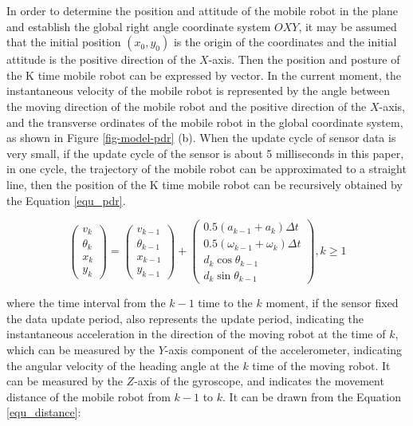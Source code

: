 \documentclass{llncs}
\begin{document}
In order to determine the position and attitude of the mobile robot in the plane and establish the global right angle coordinate system $OXY$, it may be assumed that the initial position $(x_0, y_0)$ is the origin of the coordinates and the initial attitude is the positive direction of the $X$-axis. Then the position and posture of the K time mobile robot can be expressed by vector. In the current moment, the instantaneous velocity of the mobile robot is represented by the angle between the moving direction of the mobile robot and the positive direction of the $X$-axis, and the transverse ordinates of the mobile robot in the global coordinate system, as shown in Figure \ref{fig-model-pdr} (b). When the update cycle of sensor data is very small, if the update cycle of the sensor is about 5 milliseconds in this paper, in one cycle, the trajectory of the mobile robot can be approximated to a straight line, then the position of the K time mobile robot can be recursively obtained by the Equation \ref{equ_pdr}.

\begin{equation}
\label{equ_pdr}
\left( {\begin{array}{*{20}{c}}
	{{v_k}}\\
	{{\theta _k}}\\
	{{x_k}}\\
	{{y_k}}
	\end{array}} \right) = \left( {\begin{array}{*{20}{c}}
	{{v_{k - 1}}}\\
	{{\theta _{k - 1}}}\\
	{{x_{k - 1}}}\\
	{{y_{k - 1}}}
	\end{array}} \right) + \left( {\begin{array}{*{20}{c}}
	{0.5({a_{k - 1}} + {a_k})\Delta t}\\
	{0.5({\omega _{k - 1}} + {\omega _k})\Delta t}\\
	{{d_k}\cos {\theta _{k - 1}}}\\
	{{d_k}\sin {\theta _{k - 1}}}
	\end{array}} \right),k \ge 1
\end{equation}

where the time interval from the $k-1$ time to the $k$ moment, if the sensor fixed the data update period, also represents the update period, indicating the instantaneous acceleration in the direction of the moving robot at the time of $k$, which can be measured by the $Y$-axis component of the accelerometer, indicating the angular velocity of the heading angle at the $k$ time of the moving robot. It can be measured by the $Z$-axis of the gyroscope, and indicates the movement distance of the mobile robot from $k-1$ to $k$. It can be drawn from the Equation \ref{equ_distance}:
\end{document}
